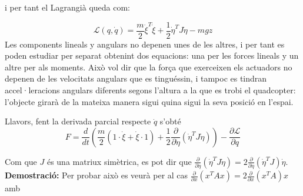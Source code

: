 \documentclass[twoside]{article}
\begin{document}
i per tant el Lagrangià queda com:

\begin{equation}
\mathcal{L}(q,\dot{q})=\frac{m}{2} \dot{\xi}^T \dot{\xi} + \frac{1}{2}\dot{\eta}^{T}J\dot{\eta}- mgz
\end{equation}
Les components lineals y angulars no depenen unes de les altres, i per tant es poden estudiar per separat obtenint dos equacions: una per les forces lineals y un altre per als moments. Això vol dir que la força que exerceixen els actuadors no depenen de les velocitats angulars que es tinguéssin, i tampoc es tindran accel·leracions angulars diferents segons l'altura a la que es trobi el quadcopter: l'objecte girarà de la mateixa manera sigui quina sigui la seva posició en l'espai.

Llavors, fent la derivada parcial respecte $\dot{q}$ s'obté
\begin{equation}
 F=\frac{d}{dt}\left(\frac{m}{2}(1\cdot\dot{\xi}+\dot{\xi}\cdot 1)+\frac{1}{2}\frac{\partial}{\partial \dot{\eta}}(\dot{\eta}^{T}J\dot{\eta})\right)-\frac{\partial \mathcal{L}}{\partial q}
\end{equation}

Com que $J$ és una matriux simètrica, es pot dir que  $\frac{\partial}{\partial \dot{\eta}}(\dot{\eta}^{T}J\dot{\eta})=2 \frac{\partial}{\partial \dot{\eta}}(\dot{\eta}^{T}J)\dot{\eta} $. \\

\textbf{Demostració:} Per probar això es veurà per al cas $\frac{\partial}{\partial x}(x^{T}Ax)=2 \frac{\partial}{\partial x}(x^{T}A)x $ amb 
\end{document}
